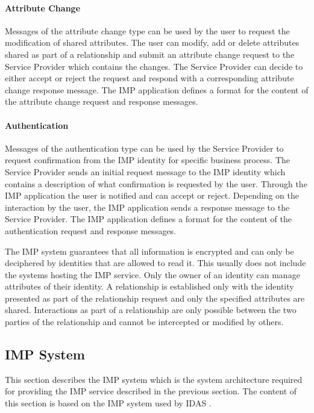\paragraph{Attribute Change} Messages of the attribute change type can be used by the user to request the modification of shared attributes. The user can modify, add or delete attributes shared as part of a relationship and submit an attribute change request to the Service Provider which contains the changes. The Service Provider can decide to either accept or reject the request and respond with a corresponding attribute change response message. 
The IMP application defines a format for the content of the attribute change request and response messages.

\paragraph{Authentication} Messages of the authentication type can be used by the Service Provider to request confirmation from the IMP identity for specific business process. The Service Provider sends an initial request message to the IMP identity which contains a description of what confirmation is requested by the user. Through the IMP application the user is notified and can accept or reject. Depending on the interaction by the user, the IMP application sends a response message to the Service Provider. 
The IMP application defines a format for the content of the authentication request and response messages.

The IMP system guarantees that all information is encrypted and can only be deciphered by identities that are allowed to read it. This usually does not include the systems hosting the IMP service. Only the owner of an identity can manage attributes of their identity. A relationship is established only with the identity presented as part of the relationship request and only the specified attributes are shared. Interactions as part of a relationship are only possible between the two parties of the relationship and cannot be intercepted or modified by others.

\subsection{IMP System} \label{section:imp_system}
This section describes the IMP system which is the system architecture required for providing the IMP service described in the previous section. The content of this section is based on the IMP system used by IDAS \cite{idas}.

